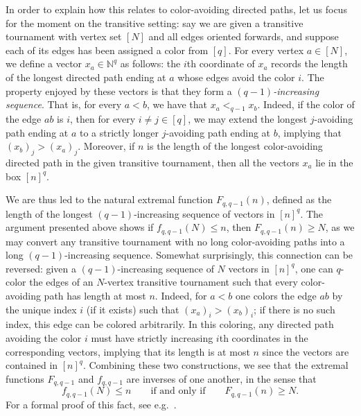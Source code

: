 \documentclass[11pt,reqno]{amsart}
\theoremstyle{definition}
\newcommand{\N}{\mathbb{N}}
\newcommand\1{\mathbf{1}}
\let\leq\leqslant
\let\geq\geqslant
\begin{document}
In order to explain how this relates to color-avoiding directed paths, let us focus for the moment on the transitive setting: say we are given a transitive tournament with vertex set $[N]$ and all edges oriented forwards, and suppose each of its edges has been assigned a color from $[q]$. For every vertex $a \in [N]$, we define a vector $x_a \in \N^q$ as follows: the $i$th coordinate of $x_a$ records the length of the longest directed path ending at $a$ whose edges avoid the color $i$. The property enjoyed by these vectors is that they form a \emph{$(q-1)$-increasing sequence}. That is, for every $a<b$, we have that $x_a <_{q-1} x_b$. Indeed, if the color of the edge $ab$ is $i$, then for every $i \neq j \in [q]$, we may extend the longest $j$-avoiding path ending at $a$ to a strictly longer $j$-avoiding path ending at $b$, implying that $(x_b)_j > (x_a)_j$. Moreover, if $n$ is the length of the longest color-avoiding directed path in the given transitive tournament, then all the vectors $x_a$ lie in the box $[n]^q$. 

We are thus led to the natural extremal function $F_{q,q-1}(n)$, defined as the length of the longest $(q-1)$-increasing sequence of vectors in $[n]^q$. The argument presented above shows if $f_{q,q-1}(N) \leq n$, then $F_{q,q-1}(n) \geq N$, as we may convert any transitive tournament with no long color-avoiding paths into a long $(q-1)$-increasing sequence. Somewhat surprisingly, this connection can be reversed: given a $(q-1)$-increasing sequence of $N$ vectors in $[n]^q$, one can $q$-color the edges of an $N$-vertex transitive tournament such that every color-avoiding path has length at most $n$. Indeed, for $a<b$ one colors the edge $ab$ by the unique index $i$ (if it exists) such that $(x_a)_i>(x_b)_i$; if there is no such index, this edge can be colored arbitrarily. In this coloring, any directed path avoiding the color $i$ must have strictly increasing $i$th coordinates in the corresponding vectors, implying that its length is at most $n$ since the vectors are contained in $[n]^q$. Combining these two constructions, we see that the extremal functions $F_{q,q-1}$ and $f_{q,q-1}$ are inverses of one another, in the sense that
\begin{equation}\label{eq:Ff equivalence}
    f_{q,q-1}(N) \leq n\qquad \text{if and only if}\qquad F_{q,q-1}(n)\geq N.
\end{equation}
For a formal proof of this fact, see e.g.\ \cite[Lemma 2.1]{1505.07312}.
\end{document}
